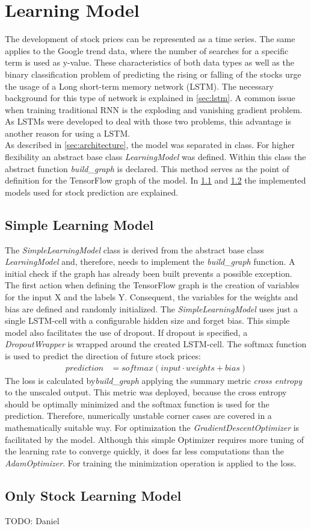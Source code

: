\section{Learning Model}
\label{sec:model}
The development of stock prices can be represented as a time series. The same applies to the Google trend data, where the number of searches for a specific term is used as y-value. These characteristics of both data types as well as the binary classification problem of predicting the rising or falling of the stocks urge the usage of a Long short-term memory network (LSTM). The necessary background for this type of network is explained in \ref{sec:lstm}. A common issue when training traditional RNN is the exploding and vanishing gradient problem. As LSTMs were developed to deal with those two problems, this advantage is another reason for using a LSTM. 
\\
As described in \ref{sec:architecture}, the model was separated in class. For higher flexibility an abstract base class \textit{LearningModel} was defined. Within this class the abstract function \textit{build\_graph} is declared. This method serves as the point of definition for the TensorFlow graph of the model. In \ref{subsec:simplelearningmodel} and \ref{subsec:onlystocklearningmodel} the implemented models used for stock prediction are explained. 

\subsection{Simple Learning Model}
\label{subsec:simplelearningmodel}
The \textit{SimpleLearningModel} class is derived from the abstract base class \textit{LearningModel} and, therefore, needs to implement the \textit{build\_graph} function. A initial check if the graph has already been built prevents a possible exception. The first action when defining the TensorFlow graph is the creation of variables for the input X and the labels Y. Consequent, the variables for the weights and bias are defined and randomly initialized. The \textit{SimpleLearningModel} uses just a single LSTM-cell with a configurable hidden size and forget bias. This simple model also facilitates the use of dropout. If dropout is specified, a \textit{DropoutWrapper} is wrapped around the created LSTM-cell. The softmax function is used to predict the direction of future stock prices:
\begin{align}
prediction &= softmax(input \cdot weights + bias)
\end{align}
The loss is calculated by\textit{build\_graph} applying the summary metric \textit{cross entropy} to the unscaled output. This metric was deployed, because the cross entropy should be optimally minimized and the softmax function is used for the prediction. Therefore, numerically unstable corner cases are covered in a mathematically suitable way. For optimization the \textit{GradientDescentOptimizer} is facilitated by the model. Although this simple Optimizer requires more tuning of the learning rate to converge quickly, it does far less computations than the \textit{AdamOptimizer}. For training the minimization operation is applied to the loss. 

\subsection{Only Stock Learning Model}
\label{subsec:onlystocklearningmodel}
TODO: Daniel